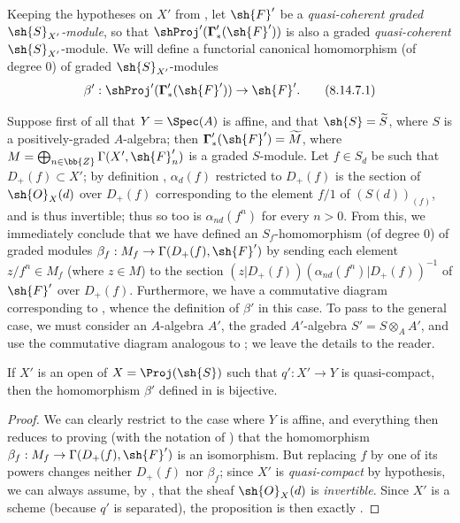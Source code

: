 \begin{env}[8.14.7]
\label{II.8.14.7}
Keeping the hypotheses on $X'$ from , let $\sh{F}'$ be a \emph{quasi-coherent graded $\sh{S}_{X'}$-module}, so that $\shProj'(\boldsymbol{\Gamma}'_*(\sh{F}'))$ is also a graded \emph{quasi-coherent} $\sh{S}_{X'}$-module.
We will define a functorial canonical homomorphism (of degree $0$) of graded $\sh{S}_{X'}$-modules
\[
\label{II.8.14.7.1}
    \beta': \shProj'(\boldsymbol{\Gamma}'_*(\sh{F}')) \to \sh{F}'.
\tag{8.14.7.1}
\]

Suppose first of all that $Y=\Spec(A)$ is affine, and that $\sh{S}=\widetilde{S}$, where $S$ is a positively-graded $A$-algebra;
then $\boldsymbol{\Gamma}'_*(\sh{F}')=\widetilde{M}$, where $M=\bigoplus_{n\in\bb{Z}}\Gamma(X',\sh{F}'_n)$ is a graded $S$-module.
Let $f\in S_d$ be such that $D_+(f)\subset X'$;
by definition , $\alpha_d(f)$ restricted to $D_+(f)$ is the section of $\sh{O}_X(d)$ over $D_+(f)$ corresponding to the element $f/1$ of $(S(d))_{(f)}$, and is thus invertible;
thus so too is $\alpha_{nd}(f^n)$ for every $n>0$.
From this, we immediately conclude that we have defined an $S_f$-homomorphism (of degree $0$) of graded modules $\beta_f:M_f\to\Gamma(D_+(f),\sh{F}')$ by sending each element $z/f^n\in M_f$ (where $z\in M$) to the section $(z|D_+(f))(\alpha_{nd}(f^n)|D_+(f))^{-1}$ of $\sh{F}'$ over $D_+(f)$.
Furthermore, we have a commutative diagram corresponding to , whence the definition of $\beta'$ in this case.
To pass to the general case, we must consider an $A$-algebra $A'$, the graded $A'$-algebra $S'=S\otimes_A A'$, and use the commutative diagram analogous to ;
we leave the details to the reader.
\end{env}

\begin{proposition}[8.14.8]
\label{II.8.14.8}
If $X'$ is an open of $X=\Proj(\sh{S})$ such that $q':X'\to Y$ is quasi-compact, then the homomorphism $\beta'$ defined in  is bijective.
\end{proposition}

\begin{proof}
We can clearly restrict to the case where $Y$ is affine, and everything then reduces to proving (with the notation of ) that the homomorphism $\beta_f:M_f\to\Gamma(D_+(f),\sh{F}')$ is an isomorphism.
But replacing $f$ by one of its powers changes neither $D_+(f)$ nor $\beta_f$;
since $X'$ is \emph{quasi-compact} by hypothesis, we can always assume, by , that the sheaf $\sh{O}_X(d)$ is \emph{invertible}.
Since $X'$ is a scheme (because $q'$ is separated), the proposition is then exactly .
\end{proof}

